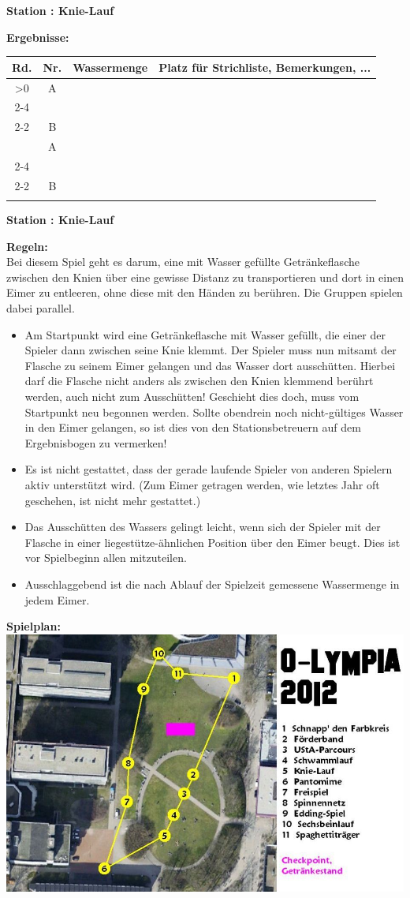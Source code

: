 \documentclass{scrartcl}
\newcommand{\replicate}[2]{\ifnum#1>0 #2
	\expandafter\replicate\expandafter{\number\numexpr#1-1}{#2}\fi}
\newcommand{\modulo}[2]{#1-((#1+#2)/#2-1)*#2}
\newcounter{station}\setcounter{station}{1}
\newcounter{ctrA}
\newcounter{ctrB}
\newcounter{currentRow}
\newcounter{noOfStations}\setcounter{noOfStations}{11}
\newenvironment{stationsheet}[3]
{\begin{center} \textbf{\huge Station \arabic{station}: #1}\\[2em]\end{center}
\textbf{\Large Ergebnisse:}\\[1em]
\setcounter{ctrA}{\value{station}}
\setcounter{ctrB}{\value{station}}
\setcounter{currentRow}{1}
\begin{tabular}{|c|c|p{3cm}|p{11cm}|}
\hline
\textbf{Rd.} & \textbf{Nr.} & \textbf{#2} & \textbf{Platz für Strichliste, Bemerkungen, ...}\\ \hline
\replicate{\value{noOfStations}}
{
\multirow{2}{*}{\arabic{currentRow}} & A\arabic{ctrA} & &
\ifthenelse{#3=0}{\\ \cline{2-4}}{\\ \cline{2-2}}
 & B\arabic{ctrB} & & \stepcounter{currentRow}
\setcounter{ctrA}{1+\modulo{\value{ctrA}-2}{\value{noOfStations}}}
\setcounter{ctrB}{1+\modulo{\value{ctrB}}{\value{noOfStations}}}
\\ \hline
}
\end{tabular}
\clearpage
\begin{center}\textbf{\huge Station \arabic{station}: #1}\end{center}
\textbf{\Large Regeln:}\\[1em]
}
{
\textbf{\Large Spielplan:}\\[1em]
\includegraphics[scale=0.57]{spielplan_11.png}
\addtocounter{station}{1}
\clearpage
}
\begin{document}
\begin{stationsheet}{Knie-Lauf}{Wassermenge}{0}
Bei diesem Spiel geht es darum, eine mit Wasser gefüllte Getränkeflasche zwischen den Knien über eine gewisse Distanz zu transportieren und dort in einen Eimer zu entleeren, ohne diese mit den Händen zu berühren. Die Gruppen spielen dabei parallel.
\begin{itemize}
\item Am Startpunkt wird eine Getränkeflasche mit Wasser gefüllt, die einer der Spieler dann zwischen seine Knie klemmt. Der Spieler muss nun mitsamt der Flasche zu seinem Eimer gelangen und das Wasser dort ausschütten. Hierbei darf die Flasche nicht anders als zwischen den Knien klemmend berührt werden, auch nicht zum Ausschütten! Geschieht dies doch, muss vom Startpunkt neu begonnen werden. Sollte obendrein noch nicht-gültiges Wasser in den Eimer gelangen, so ist dies von den Stationsbetreuern auf dem Ergebnisbogen zu vermerken!
\item Es ist nicht gestattet, dass der gerade laufende Spieler von anderen Spielern aktiv unterstützt wird. (Zum Eimer getragen werden, wie letztes Jahr oft geschehen, ist nicht mehr gestattet.)
\item Das Ausschütten des Wassers gelingt leicht, wenn sich der Spieler mit der Flasche in einer liegestütze-ähnlichen Position über den Eimer beugt. Dies ist vor Spielbeginn allen mitzuteilen.
\item Ausschlaggebend ist die nach Ablauf der Spielzeit gemessene Wassermenge in jedem Eimer.
\end{itemize}
\end{stationsheet}
\end{document}
